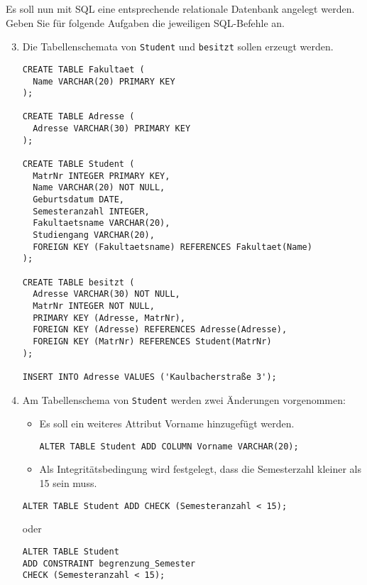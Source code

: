 \documentclass{bschlangaul-aufgabe}
\begin{document}
\noindent
Es soll nun mit SQL eine entsprechende relationale Datenbank
angelegt werden. Geben Sie für folgende Aufgaben die jeweiligen
SQL-Befehle an.

\begin{enumerate}
\setcounter{enumi}{2}

\item Die Tabellenschemata von \texttt{Student} und \texttt{besitzt}
sollen erzeugt werden.

\begin{bAntwort}
\begin{verbatim}
CREATE TABLE Fakultaet (
  Name VARCHAR(20) PRIMARY KEY
);

CREATE TABLE Adresse (
  Adresse VARCHAR(30) PRIMARY KEY
);

CREATE TABLE Student (
  MatrNr INTEGER PRIMARY KEY,
  Name VARCHAR(20) NOT NULL,
  Geburtsdatum DATE,
  Semesteranzahl INTEGER,
  Fakultaetsname VARCHAR(20),
  Studiengang VARCHAR(20),
  FOREIGN KEY (Fakultaetsname) REFERENCES Fakultaet(Name)
);

CREATE TABLE besitzt (
  Adresse VARCHAR(30) NOT NULL,
  MatrNr INTEGER NOT NULL,
  PRIMARY KEY (Adresse, MatrNr),
  FOREIGN KEY (Adresse) REFERENCES Adresse(Adresse),
  FOREIGN KEY (MatrNr) REFERENCES Student(MatrNr)
);

INSERT INTO Adresse VALUES ('Kaulbacherstraße 3');

\end{verbatim}
\end{bAntwort}

\item Am Tabellenschema von \texttt{Student} werden zwei Änderungen
vorgenommen:

\begin{itemize}
\item Es soll ein weiteres Attribut Vorname hinzugefügt werden.

\begin{bAntwort}
\begin{verbatim}
ALTER TABLE Student ADD COLUMN Vorname VARCHAR(20);
\end{verbatim}
\end{bAntwort}

\item Als Integritätsbedingung wird festgelegt, dass die Semesterzahl
kleiner als 15 sein muss.
\end{itemize}

\begin{bAntwort}
\begin{verbatim}
ALTER TABLE Student ADD CHECK (Semesteranzahl < 15);
\end{verbatim}

oder

\begin{verbatim}
ALTER TABLE Student
ADD CONSTRAINT begrenzung_Semester
CHECK (Semesteranzahl < 15);
\end{verbatim}
\end{bAntwort}

\end{enumerate}
\end{document}
